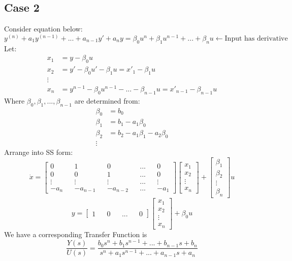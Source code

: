 \documentclass[12pt,a4paper]{article}
\begin{document}
	\subsection{Case 2}
	Consider equation below:
	\[
	y^{(n)} + a_1y^{(n-1)} + ... + a_{n-1}y' + a_n y = \beta_0u^n + \beta_1u^{n-1}+ ... +\beta_nu  \leftarrow \text{Input has derivative}
	\]
	Let:
	\[
	\begin{split}
		x_1 &= y - \beta_0 u \\
		x_2 &= y' - \beta_0 u' - \beta_1 u = x'_1-\beta_1u \\
		\vdots \\
		x_n &= y^{n-1} - \beta_0 u^{n-1} - ... - \beta_{n-1} u = x'_{n-1}-\beta_{n-1}u
	\end{split}
	\]
	Where \(\beta_0 , \beta_1 , ... , \beta_{n-1}\) are determined from:
	\[
	\begin{split}
		\beta_0 &= b_0 \\
		\beta_1 &= b_1 - a_1\beta_0 \\
		\beta_2 &= b_2 - a_1\beta_1 - a_2\beta_0 \\
		\vdots
	\end{split}
	\]
	Arrange into SS form:
	\[
	\dot{x} = 
	\begin{bmatrix}
		0      &   & 1        &   & 0        &   & ... &   & 0      \\
		0      &   & 0        &   & 1        &   & ... &   & 0      \\
		\vdots &   & \vdots   &   & \vdots   &   & ... &   & \vdots \\
		-a_n   &   & -a_{n-1} &   & -a_{n-2} &   & ... &   & -a_1   
	\end{bmatrix}
	\begin{bmatrix}
		x_1    \\
		x_2    \\
		\vdots \\
		x_n    
	\end{bmatrix} +
	\begin{bmatrix}
		\beta_1 \\
		\beta_2 \\
		\vdots  \\
		\beta_n 
	\end{bmatrix} u
	\]
	\[
	y =
	\begin{bmatrix}
		1 &   & 0 &   & ... &   & 0 
	\end{bmatrix}
	\begin{bmatrix}
		x_1    \\
		x_2    \\
		\vdots \\
		x_n    
	\end{bmatrix} + \beta_0 u
	\]
	We have a corresponding Transfer Function is 
	\[\frac{Y(s)}{U(s)} = \frac{b_0 s^n + b_1s^{n-1} + ... + b_{n-1}s+ b_n}{s^n+a_1s^{n-1}+...+a_{n-1}s+a_n}\]
	
\end{document}
